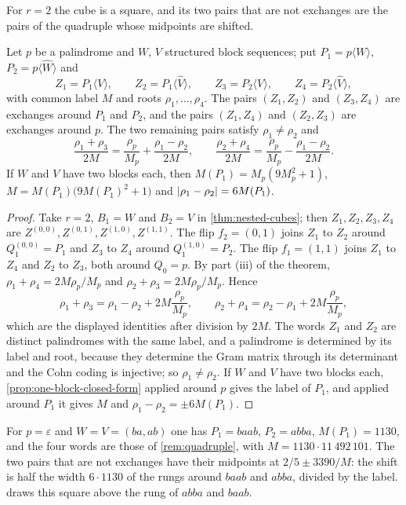 For $r=2$ the cube is a square, and its two pairs that are not exchanges are the pairs of the
quadruple whose midpoints are shifted.

\begin{corollary}
\label{cor:nested-square}
Let $p$ be a palindrome and $W$, $V$ structured block sequences; put $P_1=p\langle W\rangle$,
$P_2=p\langle\widehat W\rangle$ and
$$
 Z_1=P_1\langle V\rangle,\qquad Z_2=P_1\langle\widehat V\rangle,\qquad
 Z_3=P_2\langle V\rangle,\qquad Z_4=P_2\langle\widehat V\rangle ,
$$
with common label $M$ and roots $\rho_1,\dots,\rho_4$. The pairs $(Z_1,Z_2)$ and $(Z_3,Z_4)$ are
exchanges around $P_1$ and $P_2$, and the pairs $(Z_1,Z_4)$ and $(Z_2,Z_3)$ are exchanges around
$p$. The two remaining pairs satisfy $\rho_1\neq\rho_2$ and
$$
 \frac{\rho_1+\rho_3}{2M}=\frac{\rho_p}{M_p}+\frac{\rho_1-\rho_2}{2M},\qquad
 \frac{\rho_2+\rho_4}{2M}=\frac{\rho_p}{M_p}-\frac{\rho_1-\rho_2}{2M}.
$$
If $W$ and $V$ have two blocks each, then $M(P_1)=M_p(9M_p^2+1)$, $M=M(P_1)\bigl(9M(P_1)^2+1\bigr)$
and $\lvert\rho_1-\rho_2\rvert=6M(P_1)$.
\end{corollary}

\begin{proof}
Take $r=2$, $B_1=W$ and $B_2=V$ in \cref{thm:nested-cubes}; then $Z_1,Z_2,Z_3,Z_4$ are
$Z^{(0,0)},Z^{(0,1)},Z^{(1,0)},Z^{(1,1)}$. The flip $f_2=(0,1)$ joins $Z_1$ to $Z_2$ around
$Q_1^{(0,0)}=P_1$ and $Z_3$ to $Z_4$ around $Q_1^{(1,0)}=P_2$. The flip $f_1=(1,1)$ joins $Z_1$ to
$Z_4$ and $Z_2$ to $Z_3$, both around $Q_0=p$. By part (iii) of the theorem,
$\rho_1+\rho_4=2M\rho_p/M_p$ and $\rho_2+\rho_3=2M\rho_p/M_p$. Hence
$$
 \rho_1+\rho_3=\rho_1-\rho_2+2M\frac{\rho_p}{M_p},\qquad
 \rho_2+\rho_4=\rho_2-\rho_1+2M\frac{\rho_p}{M_p},
$$
which are the displayed identities after division by $2M$. The words $Z_1$ and $Z_2$ are distinct
palindromes with the same label, and a palindrome is determined by its label and root, because
they determine the Gram matrix through its determinant and the Cohn coding is injective; so
$\rho_1\neq\rho_2$. If $W$ and $V$ have two blocks each, \cref{prop:one-block-closed-form}
applied around $p$ gives the label of $P_1$, and applied around $P_1$ it gives $M$ and
$\rho_1-\rho_2=\pm6M(P_1)$.
\end{proof}

For $p=\varepsilon$ and $W=V=(ba,ab)$ one has $P_1=baab$, $P_2=abba$, $M(P_1)=1130$, and the four
words are those of \cref{rem:quadruple}, with $M=1130\cdot11\,492\,101$. The two pairs that are not
exchanges have their midpoints at $2/5\pm3390/M$: the shift is half the width $6\cdot1130$ of the
rungs around $baab$ and $abba$, divided by the label.  draws this square
above the rung of $abba$ and $baab$.

